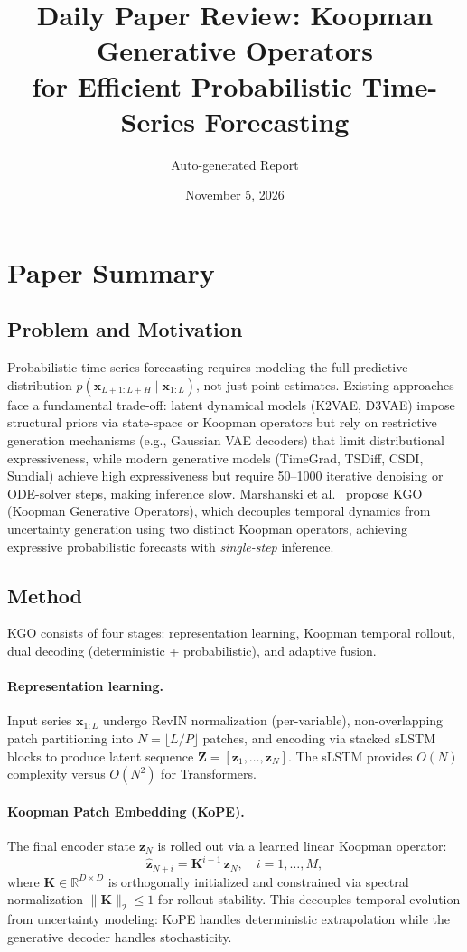 \documentclass[11pt,a4paper]{article}
\title{Daily Paper Review: Koopman Generative Operators\\for Efficient Probabilistic Time-Series Forecasting}
\author{Auto-generated Report}
\date{November 5, 2026}
\begin{document}
\maketitle

\section{Paper Summary}

\subsection{Problem and Motivation}
Probabilistic time-series forecasting requires modeling the full predictive distribution $p(\mathbf{x}_{L+1:L+H} \mid \mathbf{x}_{1:L})$, not just point estimates. Existing approaches face a fundamental trade-off: latent dynamical models (K2VAE, D3VAE) impose structural priors via state-space or Koopman operators but rely on restrictive generation mechanisms (e.g., Gaussian VAE decoders) that limit distributional expressiveness, while modern generative models (TimeGrad, TSDiff, CSDI, Sundial) achieve high expressiveness but require 50--1000 iterative denoising or ODE-solver steps, making inference slow. Marshanski et al.~\cite{marshanski2026kgo} propose KGO (Koopman Generative Operators), which decouples temporal dynamics from uncertainty generation using two distinct Koopman operators, achieving expressive probabilistic forecasts with \emph{single-step} inference.

\subsection{Method}
KGO consists of four stages: representation learning, Koopman temporal rollout, dual decoding (deterministic + probabilistic), and adaptive fusion.

\paragraph{Representation learning.}
Input series $\mathbf{x}_{1:L}$ undergo RevIN normalization (per-variable), non-overlapping patch partitioning into $N = \lfloor L/P \rfloor$ patches, and encoding via stacked sLSTM blocks to produce latent sequence $\mathbf{Z} = [\mathbf{z}_1, \ldots, \mathbf{z}_N]$. The sLSTM provides $O(N)$ complexity versus $O(N^2)$ for Transformers.

\paragraph{Koopman Patch Embedding (KoPE).}
The final encoder state $\mathbf{z}_N$ is rolled out via a learned linear Koopman operator:
\begin{equation}
  \hat{\mathbf{z}}_{N+i} = \mathbf{K}^{i-1}\,\mathbf{z}_N, \quad i = 1, \ldots, M,
\end{equation}
where $\mathbf{K} \in \mathbb{R}^{D \times D}$ is orthogonally initialized and constrained via spectral normalization $\|\mathbf{K}\|_2 \leq 1$ for rollout stability. This decouples temporal evolution from uncertainty modeling: KoPE handles deterministic extrapolation while the generative decoder handles stochasticity.
\end{document}
